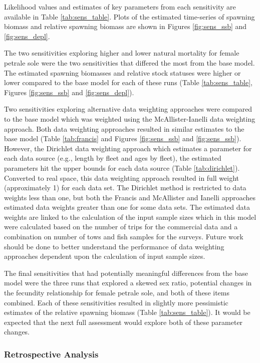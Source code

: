 \documentclass[12pt,]{article}
\begin{document}
Likelihood values and estimates of key parameters from each sensitivity
are available in Table \ref{tab:sens_table}. Plots of the estimated
time-series of spawning biomass and relative spawning biomass are shown
in Figures \ref{fig:sens_ssb} and \ref{fig:sens_depl}.

The two sensitivities exploring higher and lower natural mortality for
female petrale sole were the two sensitivities that differed the most
from the base model. The estimated spawning biomasses and relative stock
statuses were higher or lower compared to the base model for each of
these runs (Table \ref{tab:sens_table}, Figures \ref{fig:sens_ssb} and
\ref{fig:sens_depl}).

Two sensitivities exploring alternative data weighting approaches were
compared to the base model which was weighted using the
McAllister-Ianelli data weighting approach. Both data weighting
approaches resulted in similar estimates to the base model (Table
\ref{tab:francis} and Figures \ref{fig:sens_ssb} and
\ref{fig:sens_ssb}). However, the Dirichlet data weighting approach
which estimates a parameter for each data source (e.g., length by fleet
and ages by fleet), the estimated parameters hit the upper bounds for
each data source (Table \ref{tab:dirichlet}). Converted to real space,
this data weighting approach resulted in full weight (approximately 1)
for each data set. The Dirichlet method is restricted to data weights
less than one, but both the Francis and McAllister and Ianelli
approaches estimated data weights greater than one for some data sets.
The estimated data weights are linked to the calculation of the input
sample sizes which in this model were calculated based on the number of
trips for the commercial data and a combination on number of tows and
fish samples for the surveys. Future work should be done to better
understand the performance of data weighting approaches dependent upon
the calculation of input sample sizes.

The final sensitivities that had potentially meaningful differences from
the base model were the three runs that explored a skewed sex ratio,
potential changes in the fecundity relationship for female petrale sole,
and both of these items combined. Each of these sensitivities resulted
in slightly more pessimistic estimates of the relative spawning biomass
(Table \ref{tab:sens_table}). It would be expected that the next full
assessment would explore both of these parameter changes.

\subsubsection{Retrospective Analysis}\label{retrospective-analysis}
\end{document}
